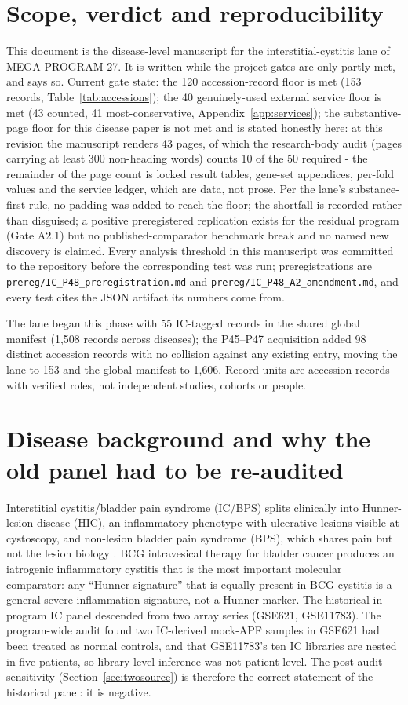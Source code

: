 \documentclass[11pt,a4paper]{article}
\begin{document}
\section{Scope, verdict and reproducibility}
This document is the disease-level manuscript for the interstitial-cystitis
lane of MEGA-PROGRAM-27. It is written while the project gates are only partly
met, and says so. Current gate state: the 120 accession-record floor is met
(153 records, Table~\ref{tab:accessions}); the 40 genuinely-used external
service floor is met (43 counted, 41 most-conservative, Appendix~\ref{app:services});
the substantive-page floor for this disease paper is not met and is stated
honestly here: at this revision the manuscript renders 43 pages, of which the
research-body audit (pages carrying at least 300 non-heading words) counts 10
of the 50 required - the remainder of the page count is locked result tables,
gene-set appendices, per-fold values and the service ledger, which are data,
not prose. Per the lane's substance-first rule, no padding was added to reach
the floor; the shortfall is recorded rather than disguised; a positive preregistered replication exists for the
residual program (Gate A2.1) but no published-comparator benchmark break and no
named new discovery is claimed. Every analysis threshold in this manuscript was
committed to the repository before the corresponding test was run; preregistrations
are \texttt{prereg/IC\_P48\_preregistration.md} and \texttt{prereg/IC\_P48\_A2\_amendment.md},
and every test cites the JSON artifact its numbers come from.

The lane began this phase with 55 IC-tagged records in the shared global
manifest (1{,}508 records across diseases); the P45--P47 acquisition added 98
distinct accession records with no collision against any existing entry, moving
the lane to 153 and the global manifest to 1{,}606. Record units are accession
records with verified roles, not independent studies, cohorts or people.

\section{Disease background and why the old panel had to be re-audited}
Interstitial cystitis/bladder pain syndrome (IC/BPS) splits clinically into
Hunner-lesion disease (HIC), an inflammatory phenotype with ulcerative lesions
visible at cystoscopy, and non-lesion bladder pain syndrome (BPS), which shares
pain but not the lesion biology \cite{lai2020,clemens2022}. BCG intravesical therapy for bladder cancer
produces an iatrogenic inflammatory cystitis \cite{pichler2024} that is the
most important molecular comparator: any ``Hunner signature'' that is equally present in BCG
cystitis is a general severe-inflammation signature, not a Hunner marker. The
historical in-program IC panel descended from two array series (GSE621,
GSE11783). The program-wide audit found two IC-derived mock-APF samples in
GSE621 had been treated as normal controls, and that GSE11783's ten IC
libraries are nested in five patients, so library-level inference was not
patient-level. The post-audit sensitivity (Section~\ref{sec:twosource}) is
therefore the correct statement of the historical panel: it is negative.
\end{document}
